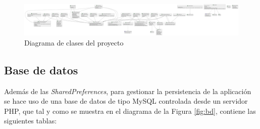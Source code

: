 \begin{figure}[H]
    \centering
    \includegraphics[width=1\linewidth]{root/diagrama.png}
    \caption{Diagrama de clases del proyecto}
    \label{fig:diagrama}
\end{figure}

\subsection{Base de datos}

Además de las \textit{SharedPreferences}, para gestionar la persistencia de la aplicación se hace uso de una base de datos de tipo MySQL controlada desde un servidor PHP, que tal y como se muestra en el diagrama de la Figura \ref{fig:bd}, contiene las siguientes tablas:

